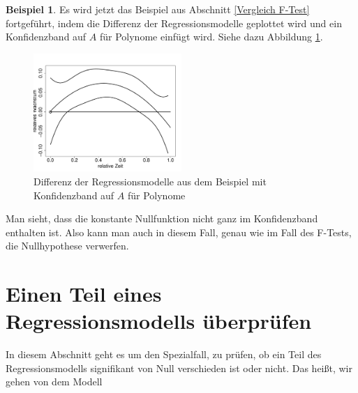 \documentclass[12pt,a4paper]{article}
\theoremstyle{definition}
\newtheorem{Beispiel}[Definition]{Beispiel}
\theoremstyle{definition}
\theoremstyle{definition}
\theoremstyle{definition}
\begin{document}
\begin{Beispiel}
Es wird jetzt das Beispiel aus Abschnitt \ref{Vergleich F-Test} fortgeführt, indem die Differenz der Regressionsmodelle geplottet wird und ein Konfidenzband auf $A$ für Polynome einfügt wird. Siehe dazu Abbildung \ref{KB-poly-hetero-BSP}.

\begin{figure}[H] 
  \centering
     \includegraphics[width=0.5\textwidth]{Bsp-KB-poly-hetero}
  \caption{Differenz der Regressionsmodelle aus dem Beispiel mit Konfidenzband auf $A$ für Polynome}
  \label{KB-poly-hetero-BSP}
\end{figure}

Man sieht, dass die konstante Nullfunktion nicht ganz im Konfidenzband enthalten ist. Also kann man auch in diesem Fall, genau wie im Fall des F-Tests, die Nullhypothese verwerfen.

\end{Beispiel}


%
%


\newpage
\section{Einen Teil eines Regressionsmodells überprüfen}
\label{Teil eines Regressionsmodells überprüfen}
In diesem Abschnitt geht es um den Spezialfall, zu prüfen, ob ein Teil des Regressionsmodells signifikant von Null verschieden ist oder nicht.  Das heißt, wir gehen von dem Modell
\end{document}
